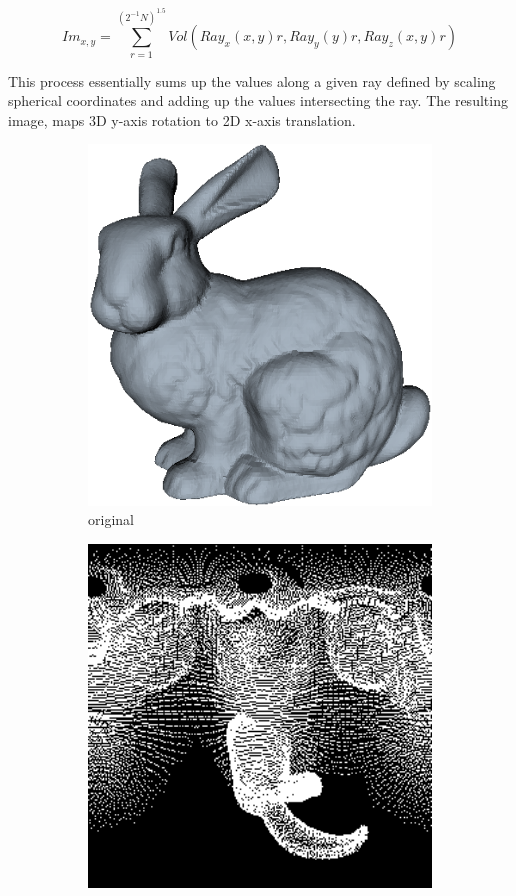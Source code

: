 \begin{equation} \label{eqn:smtUpdate}
Im_{x,y} = \sum_{r=1}^{(2^{-1}N)^{1.5}}{Vol(Ray_x(x,y)r, Ray_y(y)r, Ray_z(x,y)r)} 
\end{equation}

This process essentially sums up the values along a given ray defined by scaling spherical coordinates and adding up the values intersecting the ray. The resulting image, maps 3D y-axis rotation to 2D x-axis translation.  \\

\begin{figure}[t] 
        \centering
        \begin{subfigure}[b]{4.2in}
                \includegraphics[width=4.2in]{images/ch2/bunny}
                \caption{original}
                \label{fig:bunnyOrig}
        \end{subfigure}
        \begin{subfigure}[b]{4.2in}
                \includegraphics[width=4.2in]{images/ch2/spherical2DMap}

\end{subfigure}
\end{figure}
